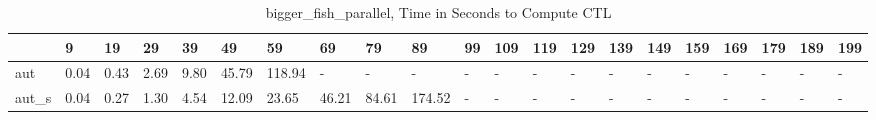 \begin{table}
\centering
\caption{bigger_fish_parallel, Time in Seconds to Compute CTL}
\label{bigger_fish_parallel_CTL_time}
\begin{tabular}{lllllllllllllllllllll}
\toprule
{} &     9 &    19 &    29 &    39 &     49 &      59 &     69 &     79 &      89 & 99 & 109 & 119 & 129 & 139 & 149 & 159 & 169 & 179 & 189 & 199 \\
\midrule
aut   &  0.04 &  0.43 &  2.69 &  9.80 &  45.79 &  118.94 &      - &      - &       - &  - &   - &   - &   - &   - &   - &   - &   - &   - &   - &   - \\
aut\_s &  0.04 &  0.27 &  1.30 &  4.54 &  12.09 &   23.65 &  46.21 &  84.61 &  174.52 &  - &   - &   - &   - &   - &   - &   - &   - &   - &   - &   - \\
\bottomrule
\end{tabular}
\end{table}
